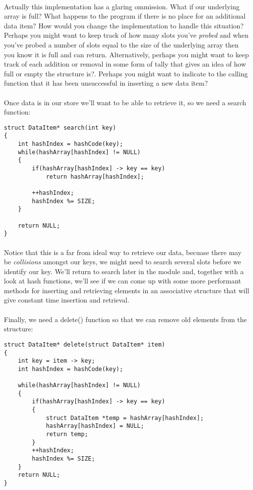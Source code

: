 \documentclass[10pt, a4paper, twosize]{article}
\begin{document}
\paragraph{} Actually this implementation has a glaring ommission. What if our underlying array is full? What happens to the program if there is no place for an additional data item? How would you change the implementation to handle this situation? Perhaps you might want to keep track of how many slots you've \emph{probed} and when you've probed a number of slots equal to the size of the underlying array then you know it is full and can return. Alternatively, perhaps you might want to keep track of each addition or removal in some form of tally that gives an idea of how full or empty the structure is?. Perhaps you might want to indicate to the calling function that it has been unsuccessful in inserting a new data item? 

\paragraph{} Once data is in our store we'll want to be able to retrieve it, so we need a search function:
\begin{lstlisting}
struct DataItem* search(int key)
{
    int hashIndex = hashCode(key);
    while(hashArray[hashIndex] != NULL)
    {
        if(hashArray[hashIndex] -> key == key)
            return hashArray[hashIndex];

        ++hashIndex;
        hashIndex %= SIZE;
    }

    return NULL;
}
\end{lstlisting}
\paragraph{} Notice that this is a far from ideal way to retrieve our data, becuase there may be \emph{collisions} amongst our keys, we might need to search several slots before we identify our key. We'll return to search later in the module and, together with a look at hash functions, we'll see if we can come up with some more performant methods for inserting and retrieving elements in an associative structure that will give constant time insertion and retrieval.

\paragraph{} Finally, we need a delete() function so that we can remove old elements from the structure:
\begin{lstlisting}
struct DataItem* delete(struct DataItem* item)
{
    int key = item -> key;
    int hashIndex = hashCode(key);

    while(hashArray[hashIndex] != NULL)
    {
        if(hashArray[hashIndex] -> key == key)
        {
            struct DataItem *temp = hashArray[hashIndex];
            hashArray[hashIndex] = NULL;
            return temp;
        }
        ++hashIndex;
        hashIndex %= SIZE;
    }
    return NULL;
}
\end{lstlisting}
\end{document}
